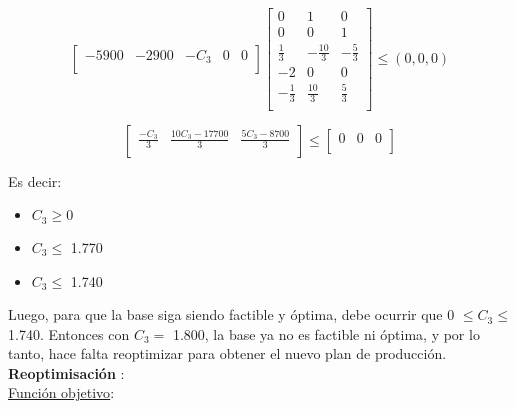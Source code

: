 \documentclass[10pt,a4paper]{article}
\begin{document}
\begin{enumerate}[label=\textbf{\sffamily\large\arabic*.}]
    \[
        \begin{bmatrix}
            -5900           &    -2900	         &    -C_3 & 0 & 0          \\
        \end{bmatrix}  \begin{bmatrix}
            0           &    1	         &   0            \\
            0           &     0	         &   1            \\
          \frac{1}{3}   &  -\frac{10}{3} & -\frac{5}{3}   \\
           -2           &     0	         &   0            \\
           -\frac{1}{3} &  \frac{10}{3}	 & \frac{5}{3}    \\
        \end{bmatrix}  
        \leq (0, 0, 0)  
    \]

    
    \[
        \begin{bmatrix}
            \frac{-C_3}{3}          &    \frac{10C_3 - 17700}{3} 	         &    \frac{5C_3 - 8700}{3}           \\
        \end{bmatrix}  
        \leq \begin{bmatrix}
            0           &    0	         &    0          \\
        \end{bmatrix} 
    \]

    Es decir:

    \begin{itemize}

        \item $C_3 \geq 0$
        \item $C_3 \leq$ 1.770
        \item $C_3 \leq$ 1.740\\

    \end{itemize}

    Luego, para que la base siga siendo factible y óptima, debe ocurrir que 0 $\leq C_3 \leq$ 1.740.
    Entonces con $C_3 = $ 1.800, la base ya no es factible ni óptima, y por lo tanto, hace falta reoptimizar para
    obtener el nuevo plan de producción.\\

    \textbf{Reoptimisación }:\\

    \underline{Función objetivo}: 

    \begin{center}
      

\end{center}
\end{enumerate}
\end{document}
